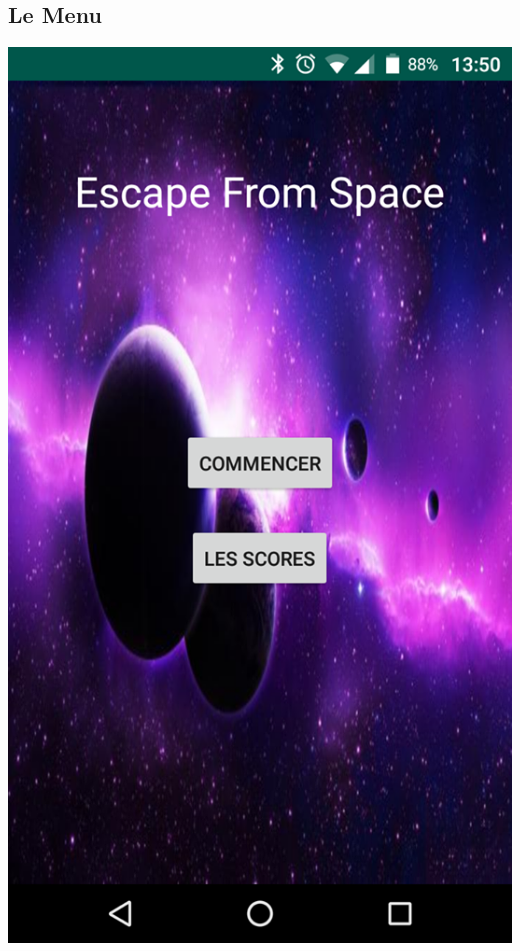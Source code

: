 \documentclass{article}
\begin{document}
\subsection{Le Menu} 
\begin{minipage}[c]{.46\linewidth}
     \begin{center}
             \includegraphics[scale=0.2]{Menu.png}
         \end{center}
   \end{minipage} \hfill
\end{document}
